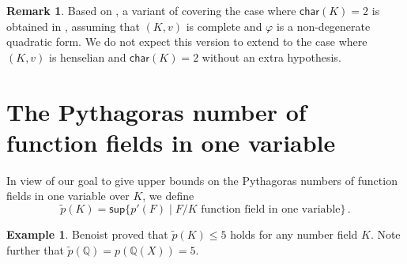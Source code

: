 \documentclass[12pt,leqno]{amsart}
\newcommand{\qq}{\mathbb Q}
\newcommand{\wt}[1]{\widetilde{{#1}}}
\renewcommand{\sup}{\mathsf{sup}}
\newcommand{\car}{\mathsf{char}}
\renewcommand{\leq}{\leqslant}
\numberwithin{equation}{section}
\theoremstyle{definition}
\newtheorem{ex}[equation]{Example}
\newtheorem{rem}[equation]{Remark}
\theoremstyle{plain}
\begin{document}
\begin{rem}
Based on \cite[Cor.~3.18 \& Rem.~3.20]{Meh19},  a variant of  covering the case where $\car(K)=2$ is obtained in \cite[Theorem 7.1]{BDD23}, assuming that $(K, v)$ is complete and $\varphi$ is a non-degenerate quadratic form. We do not expect this version to extend to the case where $(K,v)$ is henselian and $\car(K)=2$ without an extra hypothesis.
\end{rem}

\section{The Pythagoras number of function fields in one variable} %

In view of our goal to give upper bounds on the Pythagoras numbers of function fields in one variable over $K$, we define 
\[\wt{p}(K)=\sup\{p'(F)\mid F/K\mbox{ function field in one variable}\}\,.\]

\begin{ex}\label{E:Pop}
Benoist \cite{Ben25} proved that $\wt{p}(K)\leq 5$ holds for any number field $K$.
Note further that $\wt{p}(\qq)=p(\qq(X))=5$.
\end{ex}
\end{document}
